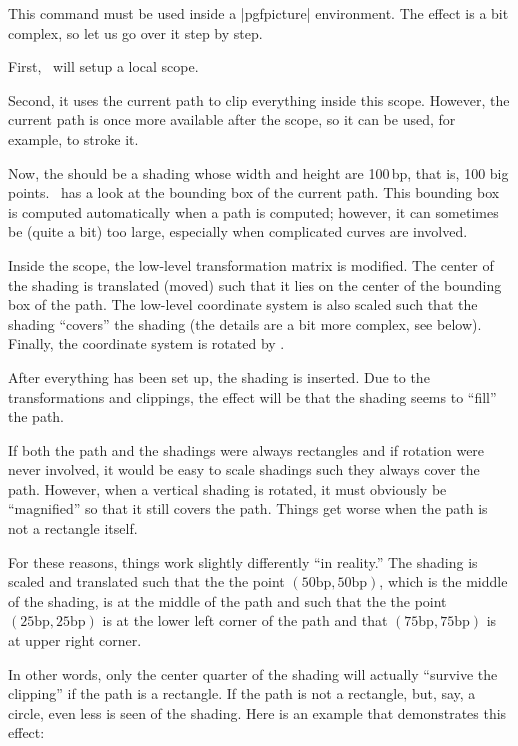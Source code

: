 \begin{command}{\pgfshadepath{}}
  This command must be used inside a |{pgfpicture}| environment. The
  effect is a bit complex, so let us go over it step by step.

  First, \pgfname\ will setup a local scope.

  Second, it uses the current path to clip everything inside this
  scope. However, the current path is once more available after the
  scope, so it can be used, for example, to stroke it.

  Now, the  should be a shading whose width and
  height are 100\,bp, that is, 100 big points. \pgfname\ has a look at
  the bounding box of the current path. This bounding box is computed
  automatically when a path is computed; however, it can sometimes be
  (quite a bit) too large, especially when complicated curves are
  involved. 

  Inside the scope, the low-level transformation matrix is modified.
  The center of the shading is translated (moved) such that it lies on
  the center of the bounding box of the path. The low-level coordinate
  system is also scaled such that the shading ``covers'' the shading (the 
  details are a bit more complex, see below). Finally, the coordinate
  system is rotated by .

  After everything has been set up, the shading is inserted. Due to
  the transformations and clippings, the effect will be that  the
  shading seems to ``fill'' the path.

  If both the path and the shadings were always rectangles and if
  rotation were never involved, it would be easy to scale shadings
  such they always cover the path. However, when a vertical shading is
  rotated, it must obviously be ``magnified'' so that it
  still covers the path. Things get worse when the path is not a
  rectangle itself.

  For these reasons, things work slightly differently ``in reality.''
  The shading is scaled and translated such that the
  the point $(50\mathrm{bp},50\mathrm{bp})$, which is the middle of
  the shading, is at the middle of the path and such that the the
  point $(25\mathrm{bp},25\mathrm{bp})$ is at the lower left corner of
  the path and that  $(75\mathrm{bp},75\mathrm{bp})$  is at upper
  right corner.

  In other words, only the center quarter of the shading will actually
  ``survive the clipping'' if the path is a rectangle. If the path is
  not a rectangle, but, say, a circle, even less is seen of the
  shading. Here is an example that demonstrates this effect:


\end{command}
